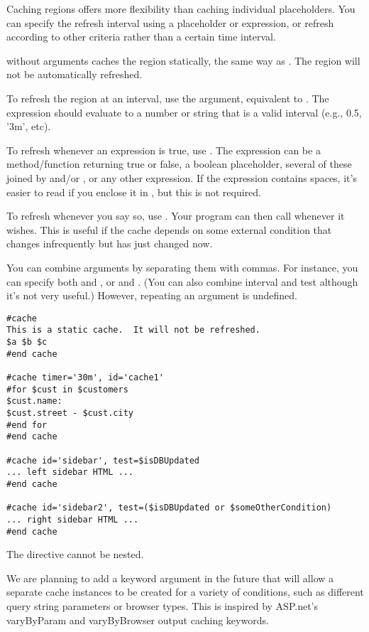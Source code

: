 Caching regions offers more flexibility than caching individual placeholders.
You can specify the refresh interval using a placeholder or
expression, or refresh according to other criteria rather than a certain
time interval.

 without arguments caches the region statically, the same
way as .  The region will not be automatically refreshed.

To refresh the region at an interval, use the  argument,
equivalent to .  The expression should evaluate to a
number or string that is a valid interval (e.g., 0.5, '3m', etc).

To refresh whenever an expression is true, use .
The expression can be a method/function returning true or false, a boolean
placeholder, several of these joined by  and/or , or any
other expression.  If the expression contains spaces, it's easier to
read if you enclose it in \code{()}, but this is not required.

To refresh whenever you say so, use .  Your program can
then call  whenever it wishes.  This is useful if the
cache depends on some external condition that changes infrequently but has just
changed now.

You can combine arguments by separating them with commas.  For instance, you can
specify both  and , or  and .
(You can also combine interval and test although it's not very useful.)
However, repeating an argument is undefined.

\begin{verbatim}
#cache
This is a static cache.  It will not be refreshed.
$a $b $c
#end cache

#cache timer='30m', id='cache1'
#for $cust in $customers
$cust.name:
$cust.street - $cust.city
#end for
#end cache

#cache id='sidebar', test=$isDBUpdated
... left sidebar HTML ...
#end cache

#cache id='sidebar2', test=($isDBUpdated or $someOtherCondition)
... right sidebar HTML ...
#end cache
\end{verbatim}


The  directive cannot be nested.

We are planning to add a  keyword argument in the future that
will allow a separate cache instances to be created for a variety of conditions,
such as different query string parameters or browser types. This is inspired by
ASP.net's varyByParam and varyByBrowser output caching keywords.

